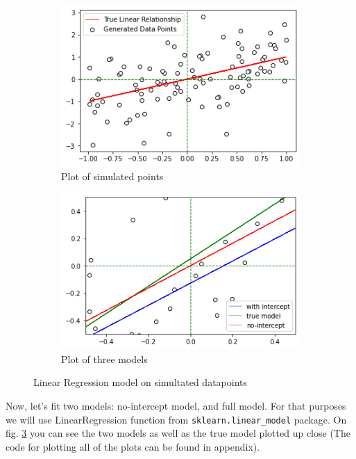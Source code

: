 \documentclass[12pt,a4paper,oneside]{book} %
\newcommand{\code}[1]{\texttt{#1}}
\begin{document}
\begin{figure}
	\begin{subfigure}{0.5\textwidth}
		\centering
		\includegraphics[width=\linewidth]{simulation.png}
		\caption{Plot of simulated points}
		\label{fig:simulation}
	\end{subfigure}%
	\begin{subfigure}{0.5\textwidth}
		\centering
		\includegraphics[width=\linewidth]{threemodels.png}
		\caption{Plot of three models}
		\label{fig:threemodels}
	\end{subfigure}
	\caption{Linear Regression model on simultated datapoints}
\end{figure}


Now, let's fit two models: no-intercept model, and full model. For that purposes we will use LinearRegression function from \code{sklearn.linear\_model} package. On fig. \ref{fig:threemodels} you can see the two models as well as the true model plotted up close (The code for plotting all of the plots can be found in appendix).
\end{document}
